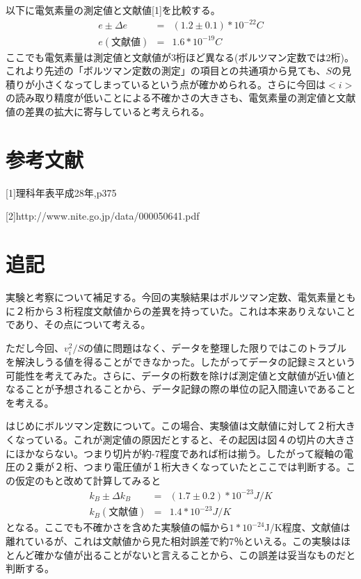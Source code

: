 \documentclass[11pt,a4j]{jsarticle}
\begin{document}
   以下に電気素量の測定値と文献値[1]を比較する。
   \begin{eqnarray}
   e \pm \Delta e &=& (1.2 \pm 0.1) * 10^{-22} C \nonumber \\
   e(文献値) &=& 1.6 * 10^{-19} C \nonumber
   \end{eqnarray}
   ここでも電気素量は測定値と文献値が3桁ほど異なる(ボルツマン定数では2桁)。これより先述の「ボルツマン定数の測定」の項目との共通項から見ても、$S$の見積りが小さくなってしまっているという点が確かめられる。さらに今回は$<i>$の読み取り精度が低いことによる不確かさの大きさも、電気素量の測定値と文献値の差異の拡大に寄与していると考えられる。
  
  
 \section{参考文献}
  [1]理科年表平成28年,p375
  
  [2]http://www.nite.go.jp/data/000050641.pdf
  
 \section{追記}
  実験と考察について補足する。今回の実験結果はボルツマン定数、電気素量ともに２桁から３桁程度文献値からの差異を持っていた。これは本来ありえないことであり、その点について考える。
  
  ただし今回、$v_i^2/S$の値に問題はなく、データを整理した限りではこのトラブルを解決しうる値を得ることができなかった。したがってデータの記録ミスという可能性を考えてみた。さらに、データの桁数を除けば測定値と文献値が近い値となることが予想されることから、データ記録の際の単位の記入間違いであることを考える。
  
  はじめにボルツマン定数について。この場合、実験値は文献値に対して２桁大きくなっている。これが測定値の原因だとすると、その起因は図４の切片の大きさにほかならない。つまり切片が約-7程度であれば桁は揃う。したがって縦軸の電圧の２乗が２桁、つまり電圧値が１桁大きくなっていたとここでは判断する。この仮定のもと改めて計算してみると
  \begin{eqnarray}
   k_B \pm \Delta k_B &=& (1.7 \pm 0.2) * 10^{-23} J/K \nonumber \\
   k_B(文献値) &=& 1.4 * 10^{-23} J/K \nonumber
  \end{eqnarray}
  となる。ここでも不確かさを含めた実験値の幅から$1*10^{-24}$J/K程度、文献値は離れているが、これは文献値から見た相対誤差で約7％といえる。この実験はほとんど確かな値が出ることがないと言えることから、この誤差は妥当なものだと判断する。
  
\end{document}
